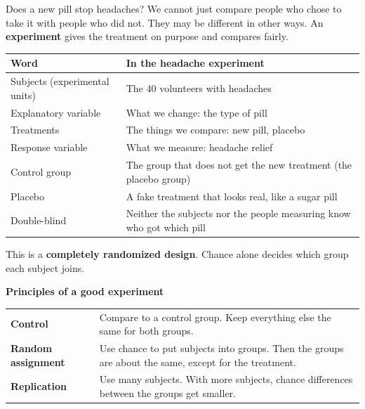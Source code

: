\documentclass[11pt]{article}
\begin{document}

Does a new pill stop headaches? We cannot just compare people who chose to take it with people who did not.
They may be different in other ways. An \textbf{experiment} gives the treatment on purpose and compares fairly.

\vspace{0.5em}
\renewcommand{\arraystretch}{1.3}
\begin{tabular}{|>{\raggedright\arraybackslash}p{1.7in}|>{\raggedright\arraybackslash}p{4.8in}|}\hline
\textbf{Word} & \textbf{In the headache experiment}\\ \hline
Subjects (experimental units) & The 40 volunteers with headaches\\ \hline
Explanatory variable & What we change: the type of pill\\ \hline
Treatments & The things we compare: new pill, placebo\\ \hline
Response variable & What we measure: headache relief\\ \hline
Control group & The group that does not get the new treatment (the placebo group)\\ \hline
Placebo & A fake treatment that looks real, like a sugar pill\\ \hline
Double-blind & Neither the subjects nor the people measuring know who got which pill\\ \hline
\end{tabular}

\begin{center}\end{center}

This is a \textbf{completely randomized design}. Chance alone decides which group each subject joins.

\vspace{0.6em}

\textbf{Principles of a good experiment}

\vspace{0.2em}
\begin{tabular}{@{}l>{\raggedright\arraybackslash}p{5.25in}}
\textbf{Control} & Compare to a control group. Keep everything else the same for both groups.\\
\textbf{Random assignment} & Use chance to put subjects into groups. Then the groups are about the same, except for the treatment.\\
\textbf{Replication} & Use many subjects. With more subjects, chance differences between the groups get smaller.\\
\end{tabular}
\end{document}
